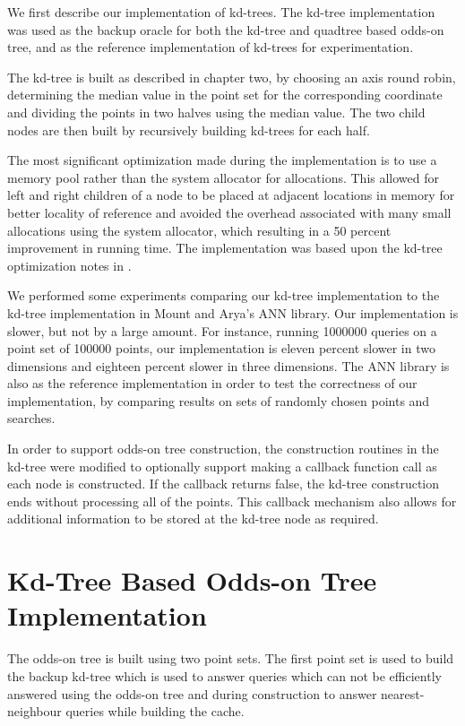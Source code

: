 \documentclass[mcs]{scsthesis}
\begin{document}
We first describe our implementation of kd-trees. The kd-tree implementation was
used as the backup oracle for both the kd-tree and quadtree based odds-on tree,
and as the reference implementation of kd-trees for experimentation.

The kd-tree is built as described in chapter two, by choosing an axis round
robin, determining the median value in the point set for the corresponding
coordinate and dividing the points in two halves using the median value. The two
child nodes are then built by recursively building kd-trees for each half.

The most significant optimization made during the implementation is to use
a memory pool rather than the system allocator for allocations. This allowed
for left and right children of a node to be placed at adjacent locations in
memory for better locality of reference and avoided the overhead associated
with many small allocations using the system allocator, which resulting in a
50 percent improvement in running time. The implementation was based upon the
kd-tree optimization notes in \cite{physicallybasedrendering}.

We performed some experiments comparing our kd-tree implementation to the 
kd-tree implementation in Mount and Arya's ANN library\cite{ann}. Our
implementation is slower, but not by a large amount. For instance, running
1000000 queries on a point set of 100000 points, our implementation is eleven
percent slower in two dimensions and eighteen percent slower in three
dimensions. The ANN library is also as the reference implementation in order
to test the correctness of our implementation, by comparing results on sets
of randomly chosen points and searches.

In order to support odds-on tree construction, the construction routines in
the kd-tree were modified to optionally support making a callback function
call as each node is constructed. If the callback returns false, the kd-tree
construction ends without processing all of the points. This callback
mechanism also allows for additional information to be stored at the kd-tree
node as required. 

\section{Kd-Tree Based Odds-on Tree Implementation}

The odds-on tree is built using two point sets. The first point set is used
to build the backup kd-tree which is used to answer queries which can not be
efficiently answered using the odds-on tree and during construction to
answer nearest-neighbour queries while building the cache.
\end{document}
